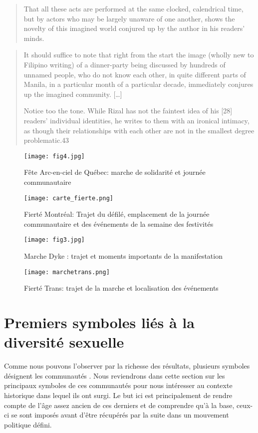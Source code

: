 \begin{quote}
  That all these acts are performed at the same clocked, calendrical time, but by actors who may be largely unaware of one another, shows the novelty of this imagined world conjured up by the author in his readers’ minds.
\citep[26]{Anderson1983}
\end{quote}

\begin{quote}
	
It should suffice to note that right from the start the image (wholly new to Filipino writing) of a dinner-party being discussed by hundreds of unnamed people, who do not know each other, in quite different parts of Manila, in a particular month of a particular decade, immediately conjures up the imagined community.
[\ldots]

Notice too the tone. 
While Rizal has not the faintest idea of his [28] readers’ individual identities, he writes to them with an ironical intimacy, as though their relationships with each other are not in the smallest degree problematic.43
\end{quote}

\begin{figure}[ht]
	\centering
	\texttt{[image: fig4.jpg]}
	\caption{Fête Arc-en-ciel de Québec: marche de solidarité et journée
    communautaire}
	\label{fig:figure4}
\end{figure}

\begin{figure}[ht]
	\centering
	\texttt{[image: carte\_fierte.png]}
	\caption[]{Fierté Montréal: Trajet du défilé, emplacement de la journée communautaire et des événements de la semaine des festivités}
	\label{fig:carte_fierte}
\end{figure}

\begin{figure}[ht]
	\centering
	\texttt{[image: fig3.jpg]}
	\caption[]{Marche Dyke : trajet et moments importants de la manifestation}
	\label{fig:figure3}
\end{figure}

\begin{figure}[ht]
	\centering
	\texttt{[image: marchetrans.png]}
	\caption[]{Fierté Trans: trajet de la marche et localisation des événements}
	\label{fig:marchetrans}
\end{figure}

\section{Premiers symboles liés à la diversité sexuelle}
\label{sec:premiers_symboles_li_s_la_diversit_sexuelle}
Comme nous pouvons l'observer par la richesse des résultats, plusieurs symboles désignent les communautés \lgbt{}.
Nous reviendrons dans cette section sur les principaux symboles de ces communautés pour nous intéresser au contexte historique dans lequel ils ont surgi.
Le but ici est principalement de rendre compte de l'âge assez ancien de ces derniers et de comprendre qu'à la base, ceux-ci se sont imposés avant d'être récupérés par la suite dans un mouvement politique défini.

